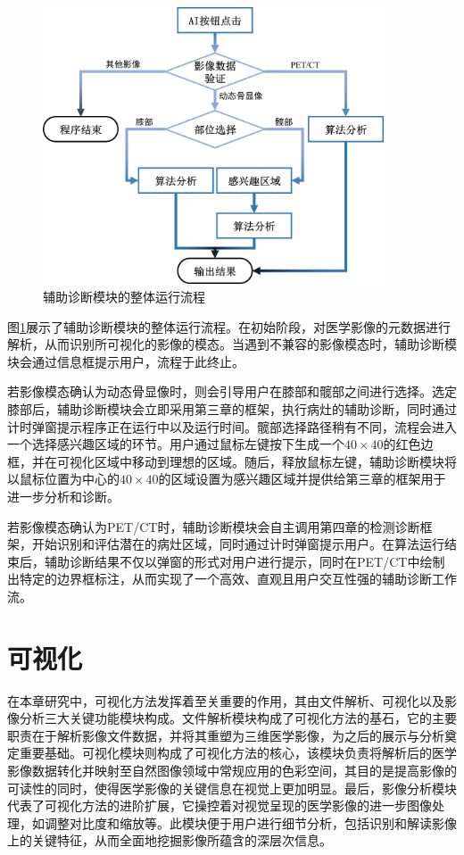 \begin{figure}[htbp]
  \centering
  \includegraphics[width=0.9\textwidth]{figures/chap05_diagnose.jpg}
  \caption{辅助诊断模块的整体运行流程}
  \label{fig:chap05_diagnose}
\end{figure}

图\ref{fig:chap05_diagnose}展示了辅助诊断模块的整体运行流程。在初始阶段，对医学影像的元数据进行解析，从而识别所可视化的影像的模态。当遇到不兼容的影像模态时，辅助诊断模块会通过信息框提示用户，流程于此终止。

若影像模态确认为动态骨显像时，则会引导用户在膝部和髋部之间进行选择。选定膝部后，辅助诊断模块会立即采用第三章的框架，执行病灶的辅助诊断，同时通过计时弹窗提示程序正在运行中以及运行时间。髋部选择路径稍有不同，流程会进入一个选择感兴趣区域的环节。用户通过鼠标左键按下生成一个\(40 \times 40\)的红色边框，并在可视化区域中移动到理想的区域。随后，释放鼠标左键，辅助诊断模块将以鼠标位置为中心的\(40 \times40 \)的区域设置为感兴趣区域并提供给第三章的框架用于进一步分析和诊断。

若影像模态确认为PET/CT时，辅助诊断模块会自主调用第四章的检测诊断框架，开始识别和评估潜在的病灶区域，同时通过计时弹窗提示用户。在算法运行结束后，辅助诊断结果不仅以弹窗的形式对用户进行提示，同时在PET/CT中绘制出特定的边界框标注，从而实现了一个高效、直观且用户交互性强的辅助诊断工作流。

\section{可视化}

在本章研究中，可视化方法发挥着至关重要的作用，其由文件解析、可视化以及影像分析三大关键功能模块构成。文件解析模块构成了可视化方法的基石，它的主要职责在于解析影像文件数据，并将其重塑为三维医学影像，为之后的展示与分析奠定重要基础。可视化模块则构成了可视化方法的核心，该模块负责将解析后的医学影像数据转化并映射至自然图像领域中常规应用的色彩空间，其目的是提高影像的可读性的同时，使得医学影像的关键信息在视觉上更加明显。最后，影像分析模块代表了可视化方法的进阶扩展，它操控着对视觉呈现的医学影像的进一步图像处理，如调整对比度和缩放等。此模块便于用户进行细节分析，包括识别和解读影像上的关键特征，从而全面地挖掘影像所蕴含的深层次信息。

